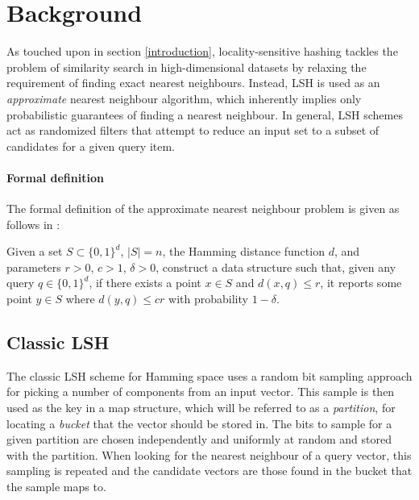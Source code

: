 \section{Background}
\label{background}

As touched upon in section \ref{introduction}, locality-sensitive hashing tackles the problem of similarity search in high-dimensional datasets by relaxing the requirement of finding exact nearest neighbours. Instead, LSH is used as an \textit{approximate} nearest neighbour algorithm, which inherently implies only probabilistic guarantees of finding a nearest neighbour. In general, LSH schemes act as randomized filters that attempt to reduce an input set to a subset of candidates for a given query item.

\paragraph{Formal definition} The formal definition of the approximate nearest neighbour problem is given as follows in \cite{DBLP:journals/corr/PhamP16}:

\begin{definition}
\label{definition-nearest-neighbour}
  Given a set $S \subset \{0, 1\}^d$, $|S| = n$, the Hamming distance function $d$, and parameters $r > 0$, $c > 1$, $\delta > 0$, construct a data structure such that, given any query $q \in \{0,1\}^d$, if there exists a point $x \in S$ and $d(x, q) \leq r$, it reports some point $y \in S$ where $d(y, q) \leq cr$ with probability $1 - \delta$.
\end{definition}

\subsection{Classic LSH}
\label{background-classic-lsh}

The classic LSH scheme for Hamming space uses a random bit sampling approach for picking a number of components from an input vector. This sample is then used as the key in a map structure, which will be referred to as a \textit{partition}, for locating a \textit{bucket} that the vector should be stored in. The bits to sample for a given partition are chosen independently and uniformly at random and stored with the partition. When looking for the nearest neighbour of a query vector, this sampling is repeated and the candidate vectors are those found in the bucket that the sample maps to.

